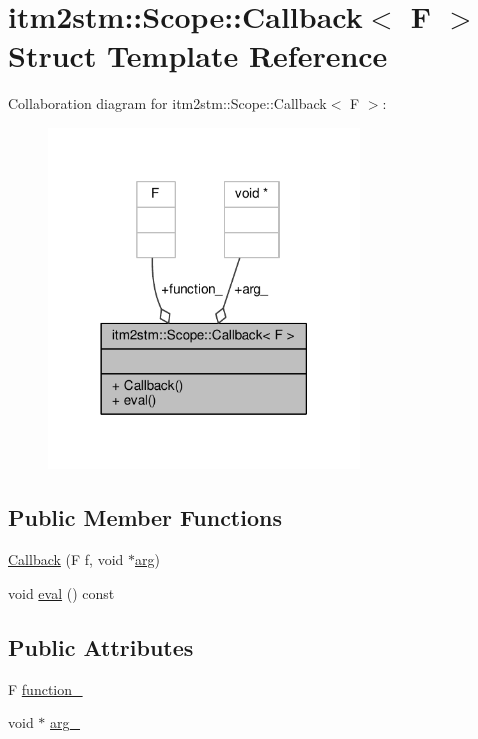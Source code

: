 \hypertarget{structitm2stm_1_1Scope_1_1Callback}{\section{itm2stm\-:\-:Scope\-:\-:Callback$<$ F $>$ Struct Template Reference}
\label{structitm2stm_1_1Scope_1_1Callback}
}


Collaboration diagram for itm2stm\-:\-:Scope\-:\-:Callback$<$ F $>$\-:
\nopagebreak
\begin{figure}[H]
\begin{center}
\leavevmode
\includegraphics[width=234pt]{structitm2stm_1_1Scope_1_1Callback__coll__graph}
\end{center}
\end{figure}
\subsection*{Public Member Functions}
\begin{DoxyCompactItemize}
\item 
\hyperlink{structitm2stm_1_1Scope_1_1Callback_a1cb5c158a859fa1e972c37b16bc25ac6}{Callback} (F f, void $\ast$\hyperlink{structarg}{arg})
\item 
void \hyperlink{structitm2stm_1_1Scope_1_1Callback_aa0743939cacae776c9e6d2b92a4d1288}{eval} () const 
\end{DoxyCompactItemize}
\subsection*{Public Attributes}
\begin{DoxyCompactItemize}
\item 
F \hyperlink{structitm2stm_1_1Scope_1_1Callback_a7c2595062b0f5e20526c68ee32491bef}{function\-\_\-}
\item 
void $\ast$ \hyperlink{structitm2stm_1_1Scope_1_1Callback_aca985326958a4925f1891baff8c8aadb}{arg\-\_\-}
\end{DoxyCompactItemize}


